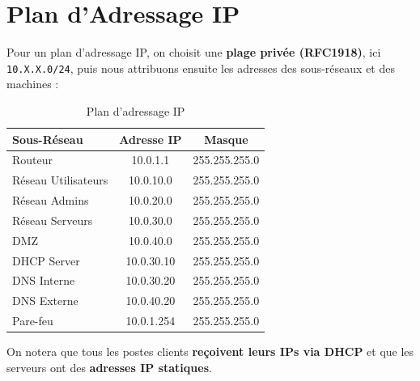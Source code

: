 \documentclass[../Livrable1.tex]{subfiles}
\begin{document}
\section*{Plan d’Adressage IP}

Pour un plan d’adressage IP, on choisit une \textbf{plage privée (RFC1918)}, ici \texttt{10.X.X.0/24}, puis nous attribuons ensuite les adresses des sous-réseaux et des machines :

\begin{table}[h]
    \centering
    \begin{tabular}{|l|c|c|}
        \hline
        \textbf{Sous-Réseau} & \textbf{Adresse IP} & \textbf{Masque} \\
        \hline
        Routeur & 10.0.1.1 & 255.255.255.0 \\
        Réseau Utilisateurs & 10.0.10.0 & 255.255.255.0 \\
        Réseau Admins & 10.0.20.0 & 255.255.255.0 \\
        Réseau Serveurs & 10.0.30.0 & 255.255.255.0 \\
        DMZ & 10.0.40.0 & 255.255.255.0 \\
        DHCP Server & 10.0.30.10 & 255.255.255.0 \\
        DNS Interne & 10.0.30.20 & 255.255.255.0 \\
        DNS Externe & 10.0.40.20 & 255.255.255.0 \\
        Pare-feu & 10.0.1.254 & 255.255.255.0 \\
        \hline
    \end{tabular}
    \caption{Plan d’adressage IP}
\end{table}

On notera que tous les postes clients \textbf{reçoivent leurs IPs via DHCP} et que les serveurs ont des \textbf{adresses IP statiques}.
\end{document}
